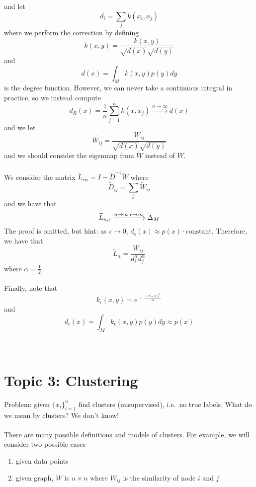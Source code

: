 \documentclass[12pt]{article}
\theoremstyle{plain}
\begin{document}
and let
\[
d_i = \sum_{j} k(x_i, x_j)
\]
where we perform the correction by defining
\[
\widetilde{k} (x, y) = \frac{k(x, y)}{\sqrt{d(x)} \sqrt{d(y)}}
\]
and
\[
d(x) = \int_M k(x, y) p(y) dy
\]
is the degree function. However, we can never take a continuous integral in practice, so we instead compute
\[
d_R (x) = \frac{1}{n} \sum_{j = 1}^n k(x, x_j) \xrightarrow{n \to \infty} d(x)
\]
and we let
\[
\widetilde{W_{ij}} = \frac{W_{ij}}{\sqrt{d(x)} \sqrt{d(y)}}
\]
and we should consider the eigenmap from $ \widetilde{W} $ instead of $ W $.
\\ \\
We consider the matrix $ \widetilde{L}_{rw} = I - \widetilde{D}^{-1} \widetilde{W} $ where
\[
\widetilde{D}_{ij} = \sum_j \widetilde{W}_{ij}
\]
and we have that
\[
\widetilde{L}_{n, \epsilon} \xrightarrow{n \to \infty \\ \epsilon \to \infty} \Delta_M
\]
The proof is omitted, but hint: as $ \epsilon \to 0, \, d_{\epsilon} (x) \approx p(x) \cdot \text{constant} $.
Therefore, we have that
\[
\widetilde{L}_{\alpha} = \frac{W_{ij}}{d_i^{\alpha} d_j^{\alpha}}
\]
where $ \alpha = \frac{1}{2} $.
\\ \\
Finally, note that
\[
k_{\epsilon} (x, y) = e^{= \frac{\| x - y \|^2}{2 \epsilon}}
\]
and
\[
d_{\epsilon} (x) = \int_M k_{\epsilon} (x, y) p(y) dy \approx p(x)
\]
\\ \\
\section{Topic 3: Clustering}
Problem: given $ \{ x_i \}_{i = 1}^n $ find clusters (unsupervised), i.e.\ no true labels.
What do we mean by clusters?
We don't know!
\\ \\
There are many possible definitions and models of clusters.
For example, we will consider two possible cases
\begin{enumerate}
    \item given data points
    \item given graph, $ W $ is $ n \times n $ where $ W_{ij} $ is the similarity of node $ i $ and $ j $
\end{enumerate}
\end{document}
